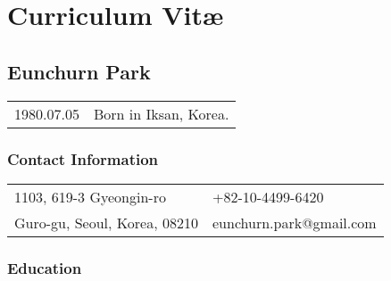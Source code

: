 \chapter*{Curriculum Vit\ae}


\section*{Eunchurn Park}
\noindent
\begin{tabular}{p{}l}
    1980.07.05 & Born in Iksan, Korea.
\end{tabular}
\subsection*{Contact Information}

%
%
%
\begin{tabularx}{\textwidth}{@{}XX@{}}
1103, 619-3 Gyeongin-ro    & +82-10-4499-6420 \\
Guro-gu, Seoul, Korea, 08210     & eunchurn.park@gmail.com\\
\end{tabularx}




\subsection*{Education}
